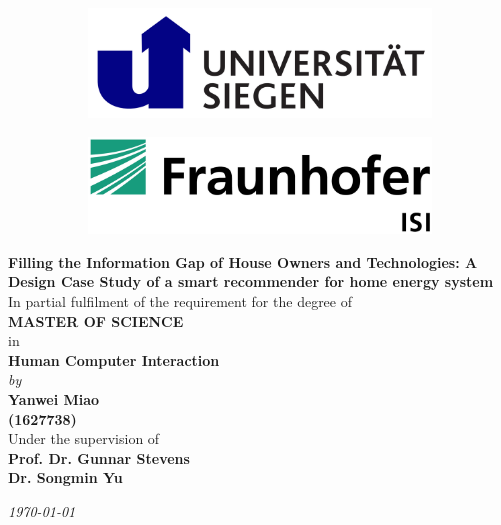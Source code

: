 \begin{titlepage}

\begin{center}

\vspace*{-1cm}

\begin{figure}[h]
  \begin{subfigure}{0.50\textwidth}
    \includegraphics[width=0.8\linewidth, left]{Images/siegen.png}
  \end{subfigure}
  \begin{subfigure}{0.49\textwidth}
    \includegraphics[width=0.8\linewidth, right]{Images/isi.jpeg}
  \end{subfigure}
\end{figure}

\vfill

{\Large \bf Filling the Information Gap of House Owners and Technologies: A Design Case Study of a smart recommender for home energy system} \\

\vfill
In partial fulfilment of the requirement for the degree of\\
{\large \bf MASTER OF SCIENCE}\\
in\\ 
{\large \bf Human Computer Interaction } \\
{\em by} \\
{\large \bf Yanwei Miao} \\
{\large \bf (1627738)}\\

Under the supervision of \\
{\bf \large Prof. Dr. Gunnar Stevens} \\
{\bf \large Dr. Songmin Yu} \\

\vfill

{\it \large \today}

\end{center}

\end{titlepage}

\clearpage